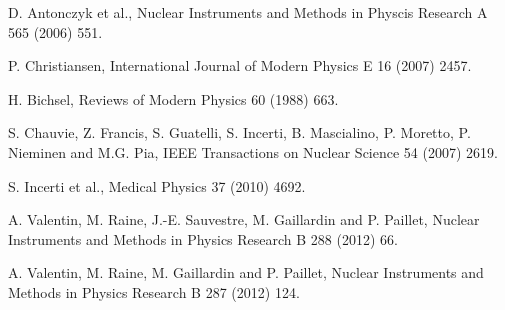 
D. Antonczyk et al., 
                    Nuclear Instruments and Methods in Physcis Research A 565 (2006) 551.

P. Christiansen,
                    International Journal of Modern Physics E 16 (2007) 2457.

H. Bichsel,  Reviews of Modern Physics 60 (1988) 663.

S. Chauvie, Z. Francis, S. Guatelli, S. Incerti, 
                        B. Mascialino, P. Moretto, P. Nieminen and M.G. Pia,
                        IEEE Transactions on Nuclear Science 54 (2007) 2619.

 S. Incerti et al.,
                      Medical Physics 37 (2010) 4692.


 A. Valentin, M. Raine, J.-E. Sauvestre, M. Gaillardin 
                      and P. Paillet,
                      Nuclear Instruments and Methods in Physics Research B 288
                      (2012) 66.

 A. Valentin, M. Raine, M. Gaillardin and P. Paillet, 
                       Nuclear Instruments and Methods in Physics Research B 287 (2012) 124.

